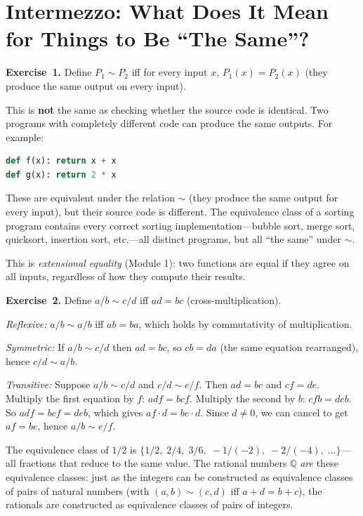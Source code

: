 \documentclass[11pt]{article}
\begin{document}
\section*{Intermezzo: What Does It Mean for Things to Be ``The Same''?}

\textbf{Exercise~1.}
Define $P_1 \sim P_2$ iff for every input $x$, $P_1(x) = P_2(x)$
(they produce the same output on every input).

This is \textbf{not} the same as checking whether the source code is
identical.  Two programs with completely different code can produce the
same outputs.  For example:

\begin{lstlisting}[language=Python]
def f(x): return x + x
def g(x): return 2 * x
\end{lstlisting}

These are equivalent under the relation $\sim$ (they produce the same
output for every input), but their source code is different.  The
equivalence class of a sorting program contains every correct sorting
implementation---bubble sort, merge sort, quicksort, insertion sort,
etc.---all distinct programs, but all ``the same'' under $\sim$.

This is \emph{extensional equality} (Module 1): two functions are
equal if they agree on all inputs, regardless of how they compute
their results.

\medskip
\textbf{Exercise~2.}
Define $a/b \sim c/d$ iff $ad = bc$ (cross-multiplication).

\emph{Reflexive:} $a/b \sim a/b$ iff $ab = ba$, which holds by
commutativity of multiplication.  \checkmark

\emph{Symmetric:} If $a/b \sim c/d$ then $ad = bc$, so $cb = da$
(the same equation rearranged), hence $c/d \sim a/b$.  \checkmark

\emph{Transitive:} Suppose $a/b \sim c/d$ and $c/d \sim e/f$.  Then
$ad = bc$ and $cf = de$.  Multiply the first equation by $f$: $adf = bcf$.
Multiply the second by $b$: $cfb = deb$.  So $adf = bcf = deb$, which
gives $af \cdot d = be \cdot d$.  Since $d \neq 0$, we can cancel to get
$af = be$, hence $a/b \sim e/f$.  \checkmark

The equivalence class of $1/2$ is
$\{1/2,\; 2/4,\; 3/6,\; -1/(-2),\; -2/(-4),\; \ldots\}$---all
fractions that reduce to the same value.  The rational numbers
$\mathbb{Q}$ \emph{are} these equivalence classes: just as the integers
can be constructed as equivalence classes of pairs of natural numbers
(with $(a,b) \sim (c,d)$ iff $a + d = b + c$), the rationals are
constructed as equivalence classes of pairs of integers.
\end{document}

